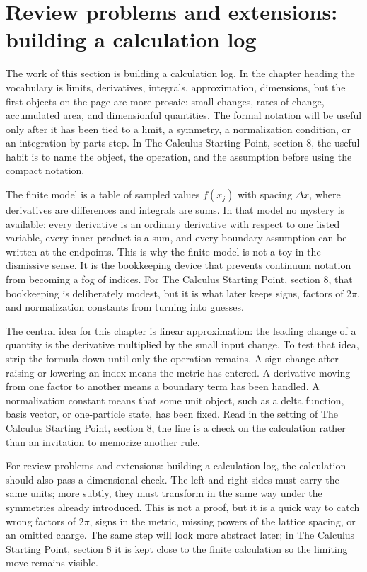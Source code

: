 \section{Review problems and extensions: building a calculation log}

The work of this section is building a calculation log.  In the chapter heading the vocabulary is limits, derivatives, integrals, approximation, dimensions, but the first objects on the page are more prosaic: small changes, rates of change, accumulated area, and dimensionful quantities.  The formal notation will be useful only after it has been tied to a limit, a symmetry, a normalization condition, or an integration-by-parts step.  In The Calculus Starting Point, section 8, the useful habit is to name the object, the operation, and the assumption before using the compact notation.

The finite model is a table of sampled values \(f(x_j)\) with spacing \(\Delta x\), where derivatives are differences and integrals are sums.  In that model no mystery is available: every derivative is an ordinary derivative with respect to one listed variable, every inner product is a sum, and every boundary assumption can be written at the endpoints.  This is why the finite model is not a toy in the dismissive sense.  It is the bookkeeping device that prevents continuum notation from becoming a fog of indices.  For The Calculus Starting Point, section 8, that bookkeeping is deliberately modest, but it is what later keeps signs, factors of \(2\pi\), and normalization constants from turning into guesses.

The central idea for this chapter is linear approximation: the leading change of a quantity is the derivative multiplied by the small input change.  To test that idea, strip the formula down until only the operation remains.  A sign change after raising or lowering an index means the metric has entered.  A derivative moving from one factor to another means a boundary term has been handled.  A normalization constant means that some unit object, such as a delta function, basis vector, or one-particle state, has been fixed.  Read in the setting of The Calculus Starting Point, section 8, the line is a check on the calculation rather than an invitation to memorize another rule.

For review problems and extensions: building a calculation log, the calculation should also pass a dimensional check.  The left and right sides must carry the same units; more subtly, they must transform in the same way under the symmetries already introduced.  This is not a proof, but it is a quick way to catch wrong factors of \(2\pi\), signs in the metric, missing powers of the lattice spacing, or an omitted charge.  The same step will look more abstract later; in The Calculus Starting Point, section 8 it is kept close to the finite calculation so the limiting move remains visible.

